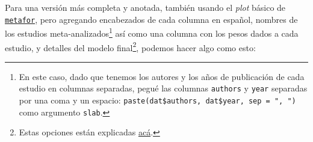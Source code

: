 \documentclass[
  bookmarksnumbered]{article}
\newenvironment{Shaded}{\begin{snugshade}}{\end{snugshade}}
\newcommand{\AttributeTok}[1]{\textcolor[rgb]{0.00,0.34,0.68}{#1}}
\newcommand{\CommentTok}[1]{\textcolor[rgb]{0.54,0.53,0.53}{#1}}
\newcommand{\ConstantTok}[1]{\textcolor[rgb]{0.67,0.33,0.00}{#1}}
\newcommand{\DecValTok}[1]{\textcolor[rgb]{0.69,0.50,0.00}{#1}}
\newcommand{\FloatTok}[1]{\textcolor[rgb]{0.69,0.50,0.00}{#1}}
\newcommand{\FunctionTok}[1]{\textcolor[rgb]{0.39,0.29,0.61}{#1}}
\newcommand{\NormalTok}[1]{\textcolor[rgb]{0.12,0.11,0.11}{#1}}
\newcommand{\SpecialCharTok}[1]{\textcolor[rgb]{0.24,0.68,0.91}{#1}}
\newcommand{\StringTok}[1]{\textcolor[rgb]{0.75,0.01,0.01}{#1}}
\begin{document}
Para una versión más completa y anotada, también usando el \emph{plot} básico de \href{https://www.metafor-project.org/doku.php}{\texttt{metafor}}, pero agregando encabezados de cada columna en español, nombres de los estudios meta-analizados\footnote{En este caso, dado que tenemos los autores y los años de publicación de cada estudio en columnas separadas, pegué las columnas \texttt{authors} y \texttt{year} separadas por una coma y un espacio: \texttt{paste(dat\$authors,\ dat\$year,\ sep\ =\ ",\ ")} como argumento \texttt{slab}.} así como una columna con los pesos dados a cada estudio, y detalles del modelo final\footnote{Estas opciones están explicadas \href{https://search.r-project.org/CRAN/refmans/metafor/html/forest.rma.html}{acá}.}, podemos hacer algo como esto:

\begin{Shaded}
\end{Shaded}
\end{document}
